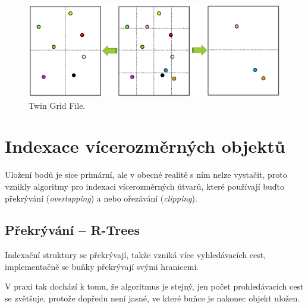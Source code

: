 \begin{figure}[H]
    \centering
    \includegraphics[width=0.9\linewidth]{grid_file_twin.pdf}
    \caption{Twin Grid File.}
\end{figure}


\section{Indexace vícerozměrných objektů}

\begin{compactitem}
    \item Uložení bodů je sice primární, ale v obecné realitě s ním nelze vystačit, proto vznikly algoritmy pro indexaci vícerozměrných útvarů, které používají buďto překrývání (\textit{overlapping}) a nebo ořezávání (\textit{clipping}).
\end{compactitem}

\subsection{Překrývání -- R-Trees}

\begin{compactitem}
    \item Indexační struktury se překrývají, takže vzniká více vyhledávacích cest, implementačně se buňky překrývají svými hranicemi.

    \item V praxi tak dochází k tomu, že algoritmus je stejný, jen počet prohledávacích cest se zvětšuje, protože dopředu není jasné, ve které buňce je nakonec objekt uložen.
\end{compactitem}


